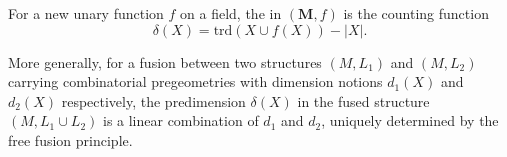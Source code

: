 For a new unary function $f$ on a field, the  in $(\mathbf{M}, f)$ is the counting function
$$\delta(X) = \text{trd}(X \cup f(X)) - |X|.$$

More generally, for a fusion between two structures $(M, L_1)$ and $(M, L_2)$ carrying combinatorial pregeometries with dimension notions $d_1(X)$ and $d_2(X)$ respectively, the predimension $\delta(X)$ in the fused structure $(M, L_1 \cup L_2)$ is a linear combination of $d_1$ and $d_2$, uniquely determined by the free fusion principle.
